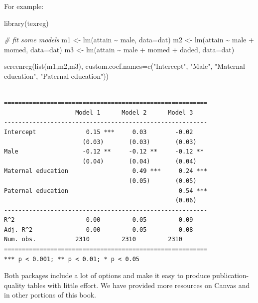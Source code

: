 \documentclass[
  letterpaper,
  DIV=11,
  numbers=noendperiod]{scrreprt}
\newenvironment{Shaded}{\begin{snugshade}}{\end{snugshade}}
\newcommand{\AttributeTok}[1]{\textcolor[rgb]{0.49,0.56,0.16}{#1}}
\newcommand{\CommentTok}[1]{\textcolor[rgb]{0.38,0.63,0.69}{\textit{#1}}}
\newcommand{\FunctionTok}[1]{\textcolor[rgb]{0.02,0.16,0.49}{#1}}
\newcommand{\NormalTok}[1]{\textcolor[rgb]{0.00,0.44,0.13}{#1}}
\newcommand{\OtherTok}[1]{\textcolor[rgb]{0.00,0.44,0.13}{#1}}
\newcommand{\SpecialCharTok}[1]{\textcolor[rgb]{0.25,0.44,0.63}{#1}}
\newcommand{\StringTok}[1]{\textcolor[rgb]{0.25,0.44,0.63}{#1}}
\begin{document}
For example:

\begin{Shaded}
\begin{Highlighting}[]
\FunctionTok{library}\NormalTok{(texreg)}

\CommentTok{\# fit some models }
\NormalTok{m1 }\OtherTok{\textless{}{-}} \FunctionTok{lm}\NormalTok{(attain }\SpecialCharTok{\textasciitilde{}}\NormalTok{ male, }\AttributeTok{data=}\NormalTok{dat)}
\NormalTok{m2 }\OtherTok{\textless{}{-}} \FunctionTok{lm}\NormalTok{(attain }\SpecialCharTok{\textasciitilde{}}\NormalTok{ male }\SpecialCharTok{+}\NormalTok{ momed, }\AttributeTok{data=}\NormalTok{dat)}
\NormalTok{m3 }\OtherTok{\textless{}{-}} \FunctionTok{lm}\NormalTok{(attain }\SpecialCharTok{\textasciitilde{}}\NormalTok{ male }\SpecialCharTok{+}\NormalTok{ momed }\SpecialCharTok{+}\NormalTok{ daded, }\AttributeTok{data=}\NormalTok{dat)}

\FunctionTok{screenreg}\NormalTok{(}\FunctionTok{list}\NormalTok{(m1,m2,m3), }
          \AttributeTok{custom.coef.names=}\FunctionTok{c}\NormalTok{(}\StringTok{"Intercept"}\NormalTok{, }\StringTok{"Male"}\NormalTok{, }\StringTok{"Maternal education"}\NormalTok{, }\StringTok{"Paternal education"}\NormalTok{))}
\end{Highlighting}
\end{Shaded}

\begin{verbatim}

=========================================================
                    Model 1      Model 2      Model 3    
---------------------------------------------------------
Intercept              0.15 ***     0.03        -0.02    
                      (0.03)       (0.03)       (0.03)   
Male                  -0.12 **     -0.12 **     -0.12 ** 
                      (0.04)       (0.04)       (0.04)   
Maternal education                  0.49 ***     0.24 ***
                                   (0.05)       (0.05)   
Paternal education                               0.54 ***
                                                (0.06)   
---------------------------------------------------------
R^2                    0.00         0.05         0.09    
Adj. R^2               0.00         0.05         0.08    
Num. obs.           2310         2310         2310       
=========================================================
*** p < 0.001; ** p < 0.01; * p < 0.05
\end{verbatim}

Both packages include a lot of options and make it easy to produce
publication-quality tables with little effort. We have provided more
resources on Canvas and in other portions of this book.
\end{document}

